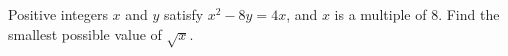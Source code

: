 Positive integers $x$ and $y$ satisfy $x^2-8y=4x$, and $x$ is a multiple of $8$. Find the smallest possible value of $\sqrt x$.
